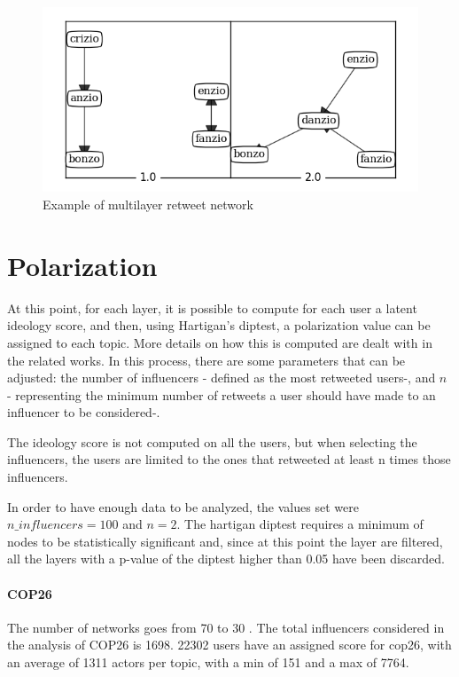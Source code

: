 \begin{figure}
    \centering
    \includegraphics[width=0.75\linewidth]{Chapter4/figures/projected_topics_ml.png}
    \caption{Example of multilayer retweet network }
    \label{fig:multilayer}
\end{figure}




\section{Polarization}
At this point, for each layer, it is possible to compute for each user a latent ideology score, and then, using Hartigan’s diptest, a polarization value  can be assigned to each topic. More details on how this is computed are dealt with in the related works. In this process, there are some parameters that can be adjusted: the number of influencers - defined as the most retweeted users-, and $n$ - representing the minimum number of retweets a user should have made to an influencer to be considered-.

The ideology score is not computed on all the users, but when selecting the influencers, the users are limited to the ones that retweeted at least n times those influencers.

In order to have enough data to be analyzed, the values set were $n\_influencers = 100$ and $n=2$. The hartigan diptest requires a minimum of nodes to be statistically significant and, since at this point the layer are filtered, all the layers with a p-value of the diptest higher than 0.05 have been discarded.


\paragraph{COP26 }
The number of networks goes from 70 to 30 . The total influencers considered in the analysis of COP26 is 1698. 22302 users have an assigned score for cop26, with an average of 1311 actors per topic, with a min of 151 and a max of 7764.

